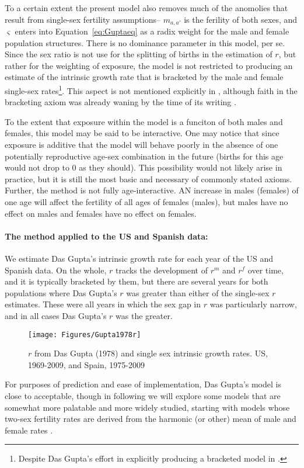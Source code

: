 To a certain extent the present model also removes much of the anomolies that
result from single-sex fertility assumptions-- $m_{a,a'}$ is the ferility of
both sexes, and $\varsigma$ enters into Equation~\eqref{eq:Guptaeq} as a radix
weight for the male and female population structures. There is no dominance
parameter in this model, per se. Since the sex ratio is not use for the
splitting of births in the estimation of $r$, but rather for the weighting of exposure,
the model is not restricted to producing an estimate of the intrinsic growth 
rate that is bracketed by the male and female single-sex rates\footnote{Despite Das Gupta's effort in
explicitly producing a bracketed model in \citet{gupta1976interactive}.}. This
aspect is not mentioned explicitly in \citet{gupta1978alternative}, although
faith in the bracketing axiom was already waning by the time of its writing
\citep{yellin1977comparison}.
 
 To the extent that exposure within the model is a funciton of both males and
 females, this model may be said to be interactive. One may notice that since
 exposure is additive that the model will behave poorly in the absence of one
 potentially reproductive age-sex combination in the future (births for this
 age would not drop to 0 as they should). This possibility would not likely
 arise in practice, but it is still the most basic and necessary of
 commonly stated axioms. Further, the method is not fully age-interactive. AN
 increase in males (females) of one age will affect the fertility of all ages of
 females (males), but males have no effect on males and females have no effect
 on females.

\paragraph{The method applied to the US and Spanish data: } We estimate Das
Gupta's intrinsic growth rate for each year of the US and Spanish data. On the
whole, $r$ tracks the development of $r^m$ and $r^f$ over time, and it is
typically bracketed by them, but there are several years for both populations
where Das Gupta's $r$ was greater than either of the single-sex $r$ estimates.
These were all years in which the sex gap in $r$ was particularly narrow, and in
all cases Das Gupta's $r$ was the greater.

\begin{figure}[ht!]
        \centering  
          \caption{$r$ from Das Gupta (1978) and single sex intrinsic growth rates. US, 1969-2009, and Spain, 1975-2009}
           \texttt{[image: Figures/Gupta1978r]}
          \label{fig:Gupta1978r}
\end{figure}

For purposes of prediction and ease of implementation, Das Gupta's model is
close to acceptable, though in following we will explore some models that are
somewhat more palatable and more widely studied, starting with models whose
two-sex fertility rates are derived from the harmonic (or other) mean of male
and female rates \citet{schoen1981harmonic}.

\FloatBarrier
